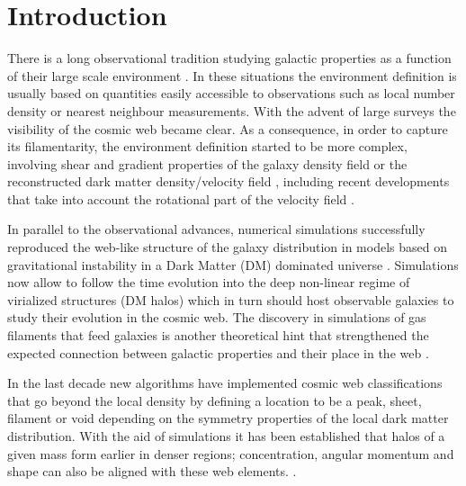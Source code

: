 \documentclass[useAMS,usenatbib]{mn2e}
\begin{document}
\section{Introduction}
\label{sec:introduction}

There is a long observational tradition studying galactic properties
as a function of their large scale environment
\citep[e.g.][]{Oemler1974,Dressler1980,Pimbblet2002,Gomez2003,Kauffmann2004,Abbas2006,Baldry2006,Park2007,OMill2008,Gonzalez2009,Padilla2010,Wilman2010,Muldrew2012}. In
these situations the environment definition is usually based on
quantities easily accessible to observations such as local number
density or nearest neighbour measurements. With
the advent of large surveys the visibility of the cosmic web became
clear. As a consequence, in order to capture its filamentarity, the
environment definition started to be more complex, involving shear and gradient properties of the galaxy density field or the reconstructed dark
matter density/velocity field
\citep[e.g.][]{Lee2005,AragonCalvo2007,Hahn2007,Sousbie2008,Zhang2009,Tweb,MunozCuartas2011,Vweb,Trowland2013,Tempel2014},
including recent developments that take into account the rotational
part of the velocity field \citep[e.g.][]{Wang2013,LibeskindVorticity}.

In parallel to the observational advances, numerical simulations
successfully reproduced the web-like structure of the galaxy
distribution in models based on gravitational instability in a Dark
Matter (DM) dominated universe
\citep[e.g.][]{Bond1996,Colberg2005}. Simulations now allow to follow
the time evolution into the deep non-linear regime of virialized
structures (DM halos) which in turn should host observable
galaxies to study their evolution in the cosmic web. The discovery in
simulations of gas filaments that feed galaxies is another theoretical
hint that strengthened the expected connection between galactic
properties and their place in the web \citep{Ocvirk2008,Dekel2009}.  


In the last decade new algorithms have implemented cosmic web
classifications that go beyond the local density by defining a
location to be a peak, sheet, filament or void depending on the
symmetry properties of the local dark matter distribution. With the
aid of simulations it has been established that halos of a given mass
form earlier in denser regions; concentration, angular momentum and
shape can also be aligned with these web
elements. \citep[e.g][]{AragonCalvo2007,Hahn2007,Zhang2009,Gonzalez2010,Noh2011,Codis2012,Libeskind2013,Trowland2013}.     
\end{document}
